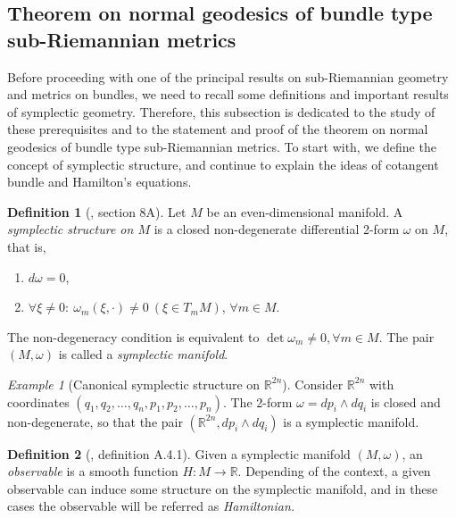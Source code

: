 \documentclass[12pt, letterpaper, reqno]{amsart}
\theoremstyle{definition}
\newtheorem{df}{Definition}
\theoremstyle{plain}
\theoremstyle{remark}
\newtheorem{ex}{Example}
\begin{document}
\subsection{Theorem on normal geodesics of bundle type sub-Riemannian metrics}
\label{sub:theorem_on_normal_geodesics}
Before proceeding with one of the principal results on sub-Riemannian geometry and metrics on bundles, we need to recall some definitions and important results of symplectic geometry. Therefore, this subsection is dedicated to the study of these prerequisites and to the statement and proof of the theorem on normal geodesics of bundle type sub-Riemannian metrics. To start with, we define the concept of symplectic structure, and continue to explain the ideas of cotangent bundle and Hamilton's equations.
\begin{df}[\cite{arnol2013mathematical}, section 8A]
	Let $ M $ be an even-dimensional manifold. A \textit{symplectic structure on $ M $ } is a closed non-degenerate differential 2-form $ \omega $ on $ M $, that is, 
	\begin{enumerate}
		\item $ d\omega=0 $,
		\item $\forall \xi \neq 0: \ \omega_m(\xi,\cdot)\neq0 \ (\xi\in T_m M)$, $ \forall m \in M. $  

	\end{enumerate}
	The non-degeneracy condition is equivalent to $ \operatorname{det} \omega_m\neq 0, \forall m\in M $. The pair $ (M,\omega) $ is called a \textit{symplectic manifold}. 
\end{df}

\begin{ex}[Canonical symplectic structure on $ \mathbb{R}^{2n}$]
	Consider $ \mathbb{R}^{2n} $ with coordinates $ (q_1,q_2,\dots,q_n,p_1,p_2,\dots,p_n) $. The 2-form $ \omega = dp_i\wedge dq_i $ is closed and non-degenerate, so that the pair $ ( \mathbb{R}^{2n}, dp_i\wedge dq_i) $ is a symplectic manifold.  
\end{ex}

\begin{df}[\cite{montgomery2002tour}, definition A.4.1]
	Given a symplectic manifold  $ (M,\omega) $, an \textit{observable} is a smooth function $ H: M \rightarrow \mathbb{R}. $ Depending of the context, a given observable can induce some structure on the symplectic manifold, and in these cases the observable will be referred as \textit{Hamiltonian.} 
\end{df}
\end{document}
